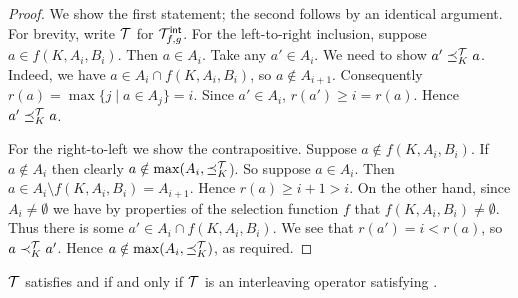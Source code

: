 \begin{proof}
    We show the first statement; the second follows by an identical argument.
    For brevity, write $\mathcal{T}$ for ${\mathcal{T}_{f, g}^\mathsf{int}}$.
    For the left-to-right inclusion, suppose $a \in f(K, A_i, B_i)$. Then $a
    \in A_i$. Take any $a' \in A_i$. We need to show $a' \preceq_K^{\mathcal{T}} a$.
    Indeed, we have $a \in A_i \cap f(K, A_i, B_i)$, so $a \notin A_{i + 1}$.
    Consequently $r(a) = \max\{j \mid a \in A_j\} = i$. Since $a' \in A_i$,
    $r(a') \ge i = r(a)$. Hence $a' \preceq_K^{\mathcal{T}} a$.

    For the right-to-left we show the contrapositive. Suppose $a \notin  f(K,
    A_i, B_i)$. If $a \notin A_i$ then clearly $a \notin \max(A_i,
    {\preceq_K^{\mathcal{T}}}$). So suppose $a \in A_i$. Then $a \in A_i \setminus f(K,
    A_i, B_i) = A_{i + 1}$. Hence $r(a) \ge i + 1 > i$. On the other hand,
    since $A_i \ne \emptyset$ we have by properties of the selection function
    $f$ that $f(K, A_i, B_i) \ne \emptyset$. Thus there is some $a' \in A_i
    \cap f(K, A_i, B_i)$. We see that $r(a') = i < r(a)$, so $a \prec_K^{\mathcal{T}}
    a'$.  Hence $a \notin \max(A_i, {\preceq_K^{\mathcal{T}}})$, as required.
\end{proof}

\begin{proposition}
    \label{tourn_result_rank_removal_smi}
    $\mathcal{T}$ satisfies \chaindef{} and \rankremoval{} if and
    only if $\mathcal{T}$ is an interleaving operator satisfying \smi{}.
\end{proposition}

